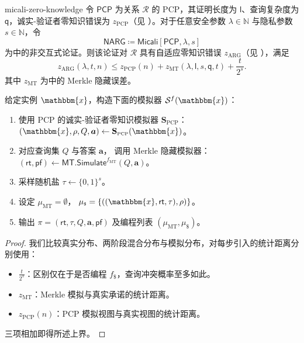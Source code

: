 \documentclass[american,singlepageview]{snargs-book-zh}
\newcommand{\Bits}{\{0,1\}}
\newcommand{\DefineEqual}{\coloneqq}
\renewcommand{\vec}[1]{\bm{#1}}
\newcommand{\Naturals}{\mathbb{N}}
\newcommand{\Relation}{\mathcal{R}}
\newcommand{\Instance}{\mathbbm{x}}
\newcommand{\InstanceSize}{n}
\newcommand{\ProtoSimulator}{S}
\newcommand{\ProtoSalt}{\tau}
\newcommand{\ProtoZKError}{z}
\newcommand{\ProtoProofLength}{\mathsf{l}}
\newcommand{\ProtoQueryComplexity}{\mathsf{q}}
\newcommand{\PCPSymbol}{\mathsf{PCP}}
\newcommand{\PCPSubscript}{\scriptscriptstyle\mathrm{PCP}}
\newcommand{\PCPFormat}[1]{\mathbf{#1}}
\newcommand{\PCPSimulator}{\PCPFormat{\ProtoSimulator}_{\PCPSubscript}}
\newcommand{\PCPEntry}{a}
\newcommand{\PCPEntries}{\vec{\PCPEntry}}
\newcommand{\PCPQuerySet}{Q}
\newcommand{\PCPVerifierRandomMessage}{\rho}
\newcommand{\PCPZKError}{\ProtoZKError_{\PCPSubscript}}
\newcommand{\PCPProofLength}{\ProtoProofLength}
\newcommand{\PCPQueryComplexity}{\ProtoQueryComplexity}
\newcommand{\PCPSampledView}{(\Instance,\PCPVerifierRandomMessage,\PCPQuerySet,\PCPEntries)}
\newcommand{\NARGSymbol}{\mathsf{NARG}}
\newcommand{\ARGSubscript}{\scriptscriptstyle\mathrm{ARG}}
\newcommand{\ARGFormat}[1]{\mathcal{#1}}
\newcommand{\ARGSimulator}{\ARGFormat{\ProtoSimulator}}
\newcommand{\ARGString}{\pi}
\newcommand{\ARGZKError}{\ProtoZKError_{\ARGSubscript}}
\newcommand{\ARGZKProgrammedList}{\ProgrammedList}
\newcommand{\ROFunction}{f}
\newcommand{\ROQueryBound}{t}
\newcommand{\SecurityParameter}{\lambda}
\newcommand{\PrivacyParameter}{s}
\newcommand{\ROTreeSymbol}{\MTSubscript}
\newcommand{\RORandSymbol}{\scriptscriptstyle \mathsf{\$}}
\newcommand{\ROTreeFunction}{\ROFunction_{\ROTreeSymbol}}
\newcommand{\RORandFunction}{\ROFunction_{\RORandSymbol}}
\newcommand{\ProgrammedList}{\mu}
\newcommand{\MTSymbol}{\mathsf{MT}}
\newcommand{\MTSubscript}{{\scriptscriptstyle\mathrm{MT}}}
\newcommand{\MTSimulator}{\MTSymbol.\mathsf{Simulate}}
\newcommand{\MTZKProofError}{\ProtoZKError_{\MTSubscript}}
\newcommand{\MTCommitment}{\mathsf{rt}}
\newcommand{\MTProof}{\mathsf{pf}}
\newcommand{\RandSaltString}{\ProtoSalt}
\newcommand{\RandSaltSize}{s}
\newcommand{\FormatTransName}[1]{\bm{\mathsf{#1}}}
\newcommand{\MicaliSymbol}{\FormatTransName{Micali}}
\newcommand{\FormatTransInputs}[3]{[#1,#2,#3]}
\newcommand{\MicaliTransformation}[3]{\MicaliSymbol\FormatTransInputs{#1}{#2}{#3}}
\newcommand{\MicaliFSQuery}{(\Instance,\MTCommitment,\RandSaltString)}
\begin{document}
\begin{ImportantTheorem}{}{micali-zero-knowledge}
令 $\PCPSymbol$ 为关系 $\Relation$ 的 PCP，其证明长度为 $\PCPProofLength$、查询复杂度为 $\PCPQueryComplexity$，诚实-验证者零知识错误为 $\PCPZKError$（见 ）。对于任意安全参数 $\SecurityParameter\in\Naturals$ 与隐私参数 $\PrivacyParameter\in\Naturals$，令
\[
  \NARGSymbol\DefineEqual\MicaliTransformation{\PCPSymbol}{\SecurityParameter}{\PrivacyParameter}
\]
为中的非交互式论证。则该论证对 $\Relation$ 具有自适应零知识错误 $\ARGZKError$（见 ），满足
\[
  \ARGZKError(\SecurityParameter,\ROQueryBound,\InstanceSize)
  \le
  \PCPZKError(\InstanceSize)
  +
  \MTZKProofError(\SecurityParameter,\PCPProofLength,\PrivacyParameter,\PCPQueryComplexity,\ROQueryBound)
  +
  \frac{\ROQueryBound}{2^{\RandSaltSize}}.
\]
其中 $\MTZKProofError$ 为中的 Merkle 隐藏误差。
\end{ImportantTheorem}

\begin{construction}
\label{construction:micali-simulator}
给定实例 $\Instance$，构造下面的模拟器 $\ARGSimulator^{\ROFunction}(\Instance)$：
\begin{enumerate}[nolistsep]
  \item 使用 PCP 的诚实-验证者零知识模拟器 $\PCPSimulator$：
    \(\PCPSampledView\gets\PCPSimulator(\Instance)\)。
  \item 对应查询集 $\PCPQuerySet$ 与答案 $\PCPEntries$，
    调用 Merkle 隐藏模拟器：
    \((\MTCommitment,\MTProof)\gets\MTSimulator^{\ROTreeFunction}(\PCPQuerySet,\PCPEntries)\)。
  \item 采样随机盐 $\RandSaltString\gets\Bits^{\RandSaltSize}$。
  \item 设定
    \(\ARGZKProgrammedList_{\ROTreeSymbol}=\emptyset\)，
    \(\ARGZKProgrammedList_{\RORandSymbol}=\{(\MicaliFSQuery,\PCPVerifierRandomMessage)\}\)。
  \item 输出
    \(\ARGString=(\MTCommitment,\RandSaltString,\PCPQuerySet,\PCPEntries,\MTProof)\)
    及编程列表
    \((\ARGZKProgrammedList_{\ROTreeSymbol},\ARGZKProgrammedList_{\RORandSymbol})\)。
\end{enumerate}
\end{construction}

\begin{proof}
我们比较真实分布、两阶段混合分布与模拟分布，对每步引入的统计距离分别使用：
\begin{itemize}[nolistsep]
  \item $\tfrac{\ROQueryBound}{2^{\RandSaltSize}}$：区别仅在于是否编程 $\RORandFunction$，查询冲突概率至多如此。
  \item $\MTZKProofError$：Merkle 模拟与真实承诺的统计距离。
  \item $\PCPZKError(\InstanceSize)$：PCP 模拟视图与真实视图的统计距离。
\end{itemize}
三项相加即得所述上界。
\end{proof}
\end{document}
